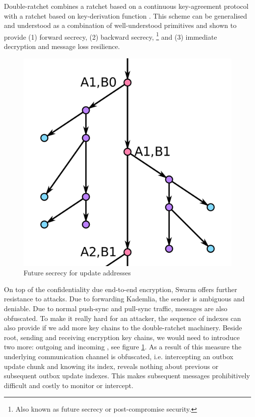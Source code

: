 Double-ratchet combines a ratchet based on a continuous key-agreement protocol with a ratchet based on key-derivation function \cite{perrin2016double}. This scheme can be generalised \cite{alwen2019double} and understood as a combination of well-understood primitives and shown to provide  (1) forward secrecy, (2) backward secrecy,%
%
\footnote{Also known as future secrecy or post-compromise security.}
%
and (3) immediate decryption and message loss resilience.


\begin{figure}[htbp]
\centering
\includegraphics[width=.6\textwidth]{fig/double-ratchet.png}
\caption[Future secrecy for update addresses \statusorange]{Future secrecy for update addresses}
\label{fig:double-ratchet-for-feeds}
\end{figure}

On top of the confidentiality due end-to-end encryption, Swarm offers further resistance to attacks. Due to forwarding Kademlia, the sender is ambiguous and deniable. Due to normal push-sync and pull-sync traffic, messages are also obfuscated. To make it really hard for an attacker, the sequence of indexes can also provide  if we add more key chains to the double-ratchet machinery. Beside root, sending and receiving encryption key chains, we would need to introduce two more: outgoing and incoming , see figure \ref{fig:double-ratchet-for-feeds}. As a result of this measure the underlying communication channel is obfuscated, i.e. intercepting an outbox update chunk and knowing its index, reveals nothing about previous or subsequent outbox update indexes. This makes subsequent messages prohibitively difficult and costly to monitor or intercept.

